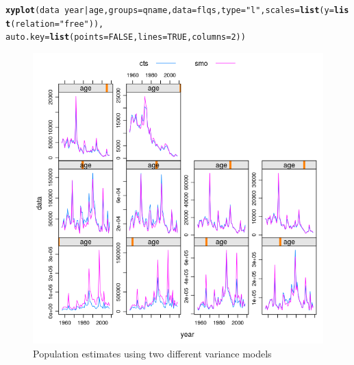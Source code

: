 \documentclass[a4paper,english,10pt]{article}\usepackage[]{graphicx}\usepackage[]{color}
\makeatletter
\def\maxwidth{ %
  \ifdim\Gin@nat@width>\linewidth
    \linewidth
  \else
    \Gin@nat@width
  \fi
}
\newcommand{\hlnum}[1]{\textcolor[rgb]{0.686,0.059,0.569}{#1}}%
\newcommand{\hlstr}[1]{\textcolor[rgb]{0.192,0.494,0.8}{#1}}%
\newcommand{\hlopt}[1]{\textcolor[rgb]{0,0,0}{#1}}%
\newcommand{\hlstd}[1]{\textcolor[rgb]{0.345,0.345,0.345}{#1}}%
\newcommand{\hlkwc}[1]{\textcolor[rgb]{0.333,0.667,0.333}{#1}}%
\newcommand{\hlkwd}[1]{\textcolor[rgb]{0.737,0.353,0.396}{\textbf{#1}}}%
\newenvironment{kframe}{%
 \def\at@end@of@kframe{}%
 \ifinner\ifhmode%
  \def\at@end@of@kframe{\end{minipage}}%
  \begin{minipage}{\columnwidth}%
 \fi\fi%
 \def\FrameCommand##1{\hskip\@totalleftmargin \hskip-\fboxsep
 \colorbox{shadecolor}{##1}\hskip-\fboxsep
     \hskip-\linewidth \hskip-\@totalleftmargin \hskip\columnwidth}%
 \MakeFramed {\advance\hsize-\width
   \@totalleftmargin\z@ \linewidth\hsize
   \@setminipage}}%
 {\par\unskip\endMakeFramed%
 \at@end@of@kframe}
\newenvironment{knitrout}{}{} %
\makeatother
\begin{document}
\begin{knitrout}
\color{fgcolor}\begin{kframe}
\begin{alltt}
\hlkwd{xyplot}\hlstd{(data} \hlopt{~} \hlstd{year} \hlopt{|} \hlstd{age,} \hlkwc{groups} \hlstd{= qname,} \hlkwc{data} \hlstd{= flqs,} \hlkwc{type} \hlstd{=} \hlstr{"l"}\hlstd{,} \hlkwc{scales} \hlstd{=} \hlkwd{list}\hlstd{(}\hlkwc{y} \hlstd{=} \hlkwd{list}\hlstd{(}\hlkwc{relation} \hlstd{=} \hlstr{"free"}\hlstd{)),}
    \hlkwc{auto.key} \hlstd{=} \hlkwd{list}\hlstd{(}\hlkwc{points} \hlstd{=} \hlnum{FALSE}\hlstd{,} \hlkwc{lines} \hlstd{=} \hlnum{TRUE}\hlstd{,} \hlkwc{columns} \hlstd{=} \hlnum{2}\hlstd{))}
\end{alltt}
\end{kframe}\begin{figure}[H]

{\centering \includegraphics[width=\maxwidth]{figure/varmod-1} 

}

\caption[Population estimates using two different variance models]{Population estimates using two different variance models}\label{fig:varmod}
\end{figure}


\end{knitrout}
\end{document}
